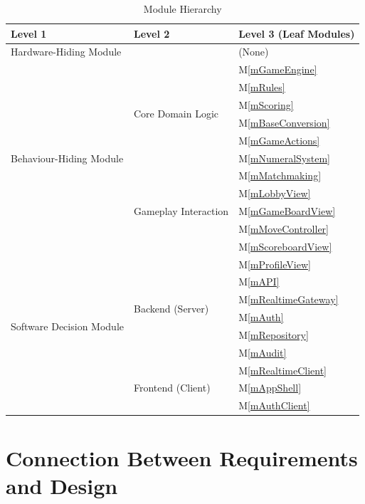 \documentclass[12pt, titlepage]{article}
\newcommand{\mref}[1]{M\ref{#1}}
\begin{document}
\begin{table}[H]
\centering
\begin{tabular}{p{} p{} p{}}
\toprule
\textbf{Level 1} & \textbf{Level 2} & \textbf{Level 3 (Leaf Modules)}\\
\midrule

\multirow{1}{0.3\textwidth}{Hardware-Hiding Module} & ~ & (None) \\
\midrule

\multirow{11}{0.3\textwidth}{Behaviour-Hiding Module}
& \multirow{6}{0.3\textwidth}{Core Domain Logic} & \mref{mGameEngine} \\
& & \mref{mRules} \\
& & \mref{mScoring} \\
& & \mref{mBaseConversion} \\
& & \mref{mGameActions} \\
& & \mref{mNumeralSystem} \\
\cmidrule{2-3}
& \multirow{5}{0.3\textwidth}{Gameplay Interaction} & \mref{mMatchmaking} \\
& & \mref{mLobbyView} \\
& & \mref{mGameBoardView} \\
& & \mref{mMoveController} \\
& & \mref{mScoreboardView} \\
& & \mref{mProfileView} \\
\midrule

\multirow{6}{0.3\textwidth}{Software Decision Module}
& \multirow{4}{0.3\textwidth}{Backend (Server)} & \mref{mAPI} \\
& & \mref{mRealtimeGateway} \\
& & \mref{mAuth} \\
& & \mref{mRepository} \\
& & \mref{mAudit} \\
\cmidrule{2-3}
& \multirow{3}{0.3\textwidth}{Frontend (Client)} & \mref{mRealtimeClient} \\
& & \mref{mAppShell} \\
& & \mref{mAuthClient} \\
\bottomrule

\end{tabular}
\caption{Module Hierarchy}
\label{TblMH}
\end{table}

\section{Connection Between Requirements and Design} \label{SecConnection}
\end{document}
